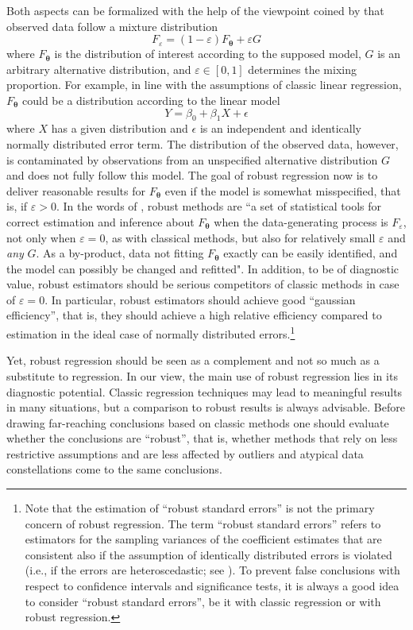 Both aspects can be formalized with the help of the viewpoint coined by 
\citet{huber64} that observed data follow a mixture distribution
\[
    F_\varepsilon = (1 - \varepsilon) F_{\boldsymbol\theta} + \varepsilon G
\]
where $F_{\boldsymbol\theta}$ is the distribution of interest according to the
supposed model, $G$ is an arbitrary alternative distribution, and $\varepsilon
\in [0,1]$ determines the mixing proportion. For example, in line with the
assumptions of classic linear regression, $F_{\boldsymbol\theta}$ could be a
distribution according to the linear model
\[
    Y = \beta_0 + \beta_1 X + \epsilon
\]
where $X$ has a given distribution and $\epsilon$ is an independent and
identically normally distributed error term. The distribution of the observed
data, however, is contaminated by observations from an unspecified alternative
distribution $G$ and does not fully follow this model. The goal of robust
regression now is to deliver reasonable results for $F_{\boldsymbol\theta}$
even if the model is somewhat misspecified, that is, if $\varepsilon>0$. In the
words of \citet[7]{heritier.etal.09}, robust methods are “a set of statistical
tools for correct estimation and inference about $F_{\boldsymbol\theta}$ when the
data-generating process is $F_\varepsilon$, not only when $\varepsilon=0$, as
with classical methods, but also for relatively small $\varepsilon$ and
\emph{any} $G$. As a by-product, data not fitting $F_{\boldsymbol\theta}$ exactly can be
easily identified, and the model can possibly be changed and refitted". In
addition, to be of diagnostic value, robust estimators should be serious
competitors of classic methods in case of $\varepsilon=0$. In particular,
robust estimators should achieve good “gaussian efficiency”, that is, they
should achieve a high relative efficiency compared to  estimation in
the ideal case of normally distributed errors.\footnote{Note that the
estimation of “robust standard errors” is not the primary concern of robust
regression. The term “robust standard errors” refers to estimators for the
sampling variances of the coefficient estimates that are consistent also if the
assumption of identically distributed errors is violated (i.e., if the errors
are heteroscedastic; see \citealp{white80}). To prevent false conclusions with
respect to confidence intervals and significance tests, it is always a good
idea to consider “robust standard errors”, be it with classic regression or
with robust regression.}

Yet, robust regression should be seen as a complement and not so much as a
substitute to  regression. In our view, the main use of robust
regression lies in its diagnostic potential. Classic regression techniques may
lead to meaningful results in many situations, but a comparison to robust
results is always advisable. Before drawing far-reaching conclusions based on
classic methods one should evaluate whether the conclusions are “robust”, that
is, whether methods that rely on less restrictive assumptions and are less
affected by outliers and atypical data constellations come to the same
conclusions.

